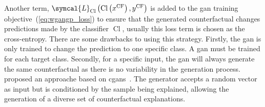 \documentclass[../main.tex]{subfiles}
\begin{document}
	Another term, \(\symcal{L}_{\operatorname{Cl}}\left(\operatorname{Cl}\left(x^{\text{CF}}\right), y^{\text{CF}}\right)\) is added to the \gls{gan} training objective~(\cref{eq:wgangp_loss}) to ensure that the generated counterfactual changes predictions made by the classifier \(\operatorname{Cl}\), usually this loss term is chosen as the cross-entropy.
	There are some drawbacks to using this strategy.
	Firstly, the \gls{gan} is only trained to change the prediction to one specific class.
	A \gls{gan} must be trained for each target class.
	Secondly, for a specific input, the \gls{gan} will always generate the same counterfactual as there is no variability in the generation process.
	\citeauthor{Yang2021ModelBasedCS} proposed an approache based on \glspl{cgan}~\cite{Yang2021ModelBasedCS}.
	The generator accepts a random vector as input but is conditioned by the sample being explained, allowing the generation of a diverse set of counterfactual explanations.
\end{document}
